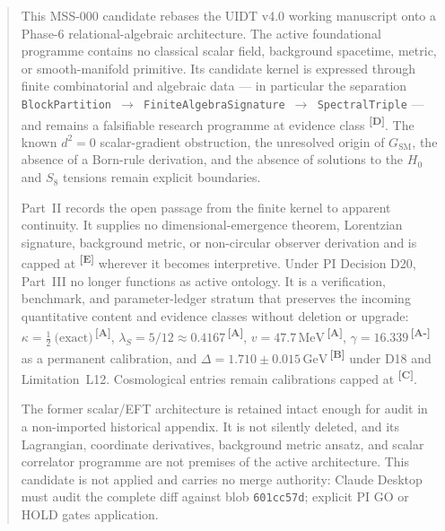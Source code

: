 \documentclass[12pt,a4paper,twoside]{article}
\theoremstyle{plain}
\theoremstyle{definition}
\theoremstyle{remark}
\newcommand{\GeV}{\,\mathrm{GeV}}
\newcommand{\MeV}{\,\mathrm{MeV}}
\newcommand{\catmark}[1]{\textsuperscript{\textsf{\textbf{[#1]}}}}
\newcommand{\lambdaS}{5/12 \approx 0.4167} %
\newcommand{\DeltaGap}{1.710 \pm 0.015\GeV} %
\newcommand{\GammaGeom}{16.339} %
\newcommand{\vVEV}{47.7\MeV} %
\newcommand{\KappaRG}{\tfrac{1}{2}\ \text{(exact)}} %
\begin{document}
\newpage
\tableofcontents
\newpage

\begin{abstract}
\begingroup \normalfont\normalsize
\setlength{\parskip}{0.65em plus 0.12em minus 0.04em}%
\setlength{\parindent}{0pt}%
\noindent This MSS-000 candidate rebases the UIDT v4.0 working manuscript
onto a Phase-6 relational-algebraic architecture. The active foundational
programme contains no classical scalar field, background spacetime, metric,
or smooth-manifold primitive. Its candidate kernel is expressed through
finite combinatorial and algebraic data --- in particular the separation
\texttt{BlockPartition $\to$ FiniteAlgebraSignature $\to$ SpectralTriple} ---
and remains a falsifiable research programme at evidence class \catmark{D}.
The known $d^2=0$ scalar-gradient obstruction, the unresolved origin of
$G_{\mathrm{SM}}$, the absence of a Born-rule derivation, and the absence of
solutions to the $H_0$ and $S_8$ tensions remain explicit boundaries.

Part~II records the open passage from the finite kernel to apparent
continuity. It supplies no dimensional-emergence theorem, Lorentzian
signature, background metric, or non-circular observer derivation and is
capped at \catmark{E} wherever it becomes interpretive. Under PI Decision
D20, Part~III no longer functions as active ontology. It is a verification,
benchmark, and parameter-ledger stratum that preserves the incoming
quantitative content and evidence classes without deletion or upgrade:
$\kappa=\KappaRG$\,\catmark{A}, $\lambda_S=\lambdaS$\,\catmark{A},
$v=\vVEV$\,\catmark{A}, $\gamma=\GammaGeom$\,\catmark{A-} as a permanent
calibration, and $\Delta=\DeltaGap$\,\catmark{B} under D18 and Limitation~L12.
Cosmological entries remain calibrations capped at \catmark{C}.

The former scalar/EFT architecture is retained intact enough for audit in a
non-imported historical appendix. It is not silently deleted, and its
Lagrangian, coordinate derivatives, background metric ansatz, and scalar
correlator programme are not premises of the active architecture. This
candidate is not applied and carries no merge authority: Claude Desktop must
audit the complete diff against blob \texttt{601cc57d}; explicit PI GO or
HOLD gates application.
\endgroup
\end{abstract}
\end{document}
